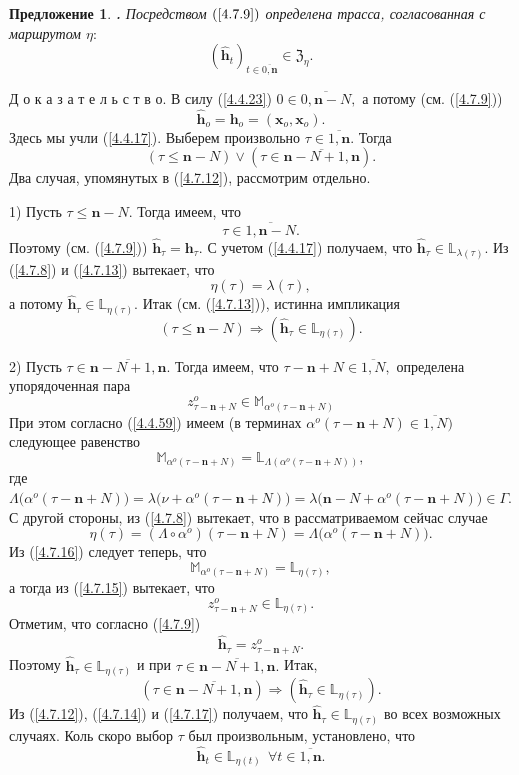 \documentclass[11pt,twoside,openany]{report}
\newcommand{\bfn}{\begin{equation}}
\newcommand{\efn}{\end{equation}}
\newcommand{\ov}{\overline}
\newcounter{theo}
\newcounter{pred}
\newtheorem{pred}{Предложение}[section]
\newcommand{\TL}{\mbox{\bf{$\!\!$.}}}
\newcommand{\La}{\Lambda}
\newcommand{\la}{\lambda}
\newcommand{\al}{\alpha}
\newcommand{\fa}{\forall}
\newcommand{\bbl}{{\mathbb L}}
\newcommand{\bbm}{{\mathbb M}}
\newcommand{\nn}{{\mathbf n}}
\begin{document}
{{\begin{pred}\label{p4.7.1}{\TL} Посредством $(\ref{4.7.9})$ определена трасса,
согласованная с маршрутом $\eta:$
\bfn\label{4.7.10}(\hat{\mathbf{h}}_t)_{t\in \ov{0,\mathbf{n}}}\in \mathfrak{Z}_\eta.
\efn
\end{pred}

Д о к а з а т е л ь с т в о. В силу (\ref{4.4.23}) $0\in\ov{0,\nn-N},$ а потому
(см. (\ref{4.7.9}))
\bfn\label{4.7.11}\hat{\mathbf{h}}_o = \mathbf{h}_o = (\mathbf{x}_o,\mathbf{x}_o).
\efn
Здесь мы учли (\ref{4.4.17}). Выберем произвольно $\tau\in\ov{1,\nn}.$ Тогда
\bfn\label{4.7.12}(\tau\leqslant \nn-N)\vee (\tau\in \ov{\nn-N+1,\nn}).
\efn
Два случая, упомянутых в (\ref{4.7.12}), рассмотрим отдельно.

1) Пусть $\tau\leqslant \nn-N.$ Тогда имеем, что
\bfn\label{4.7.13}\tau\in \ov{1,\nn-N}.
\efn
Поэтому (см. (\ref{4.7.9})) $\hat{\mathbf{h}}_\tau = \mathbf{h}_\tau.$ С учетом
(\ref{4.4.17}) получаем, что $\hat{\mathbf{h}}_\tau\in \bbl_{\la(\tau)}.$ Из
(\ref{4.7.8}) и (\ref{4.7.13}) вытекает, что
$$\eta(\tau) = \la(\tau),
$$
а потому $\hat{\mathbf{h}}_\tau\in\bbl_{\eta(\tau)}.$ Итак (см. (\ref{4.7.13})),
истинна импликация
\bfn\label{4.7.14}(\tau\leqslant \nn-N) \Longrightarrow (\hat{\mathbf{h}}_\tau\in \bbl_{\eta(\tau)}).
\efn

2) Пусть $\tau\in\ov{\nn-N+1,\nn}.$ Тогда имеем, что $\tau-\nn+N\in\ov{1,N},$ определена
упорядоченная пара
\bfn\label{4.7.15}z_{\tau-\nn+N}^o\in\bbm_{\al^o(\tau-\nn+N)}
\efn
При этом согласно (\ref{4.4.59}) имеем (в терминах $\al^o(\tau-\nn+N)\in\ov{1,N})$
следующее равенство
\bfn\label{4.7.16}\bbm_{\al^o(\tau-\nn+N)} = \bbl_{\La(\al^o(\tau-\nn+N))},
\efn
где $\La\bigl(\al^o(\tau-\nn+N)\bigl) = \la\bigl(\nu + \al^o(\tau-\nn+N)\bigl) =
\la\bigl(\nn-N +\al^o(\tau-\nn+N)\bigl) \in \Gamma.$  С другой стороны, из (\ref{4.7.8})
вытекает, что в рассматриваемом сейчас случае
$$\eta(\tau) = (\La\circ \al^o)(\tau-\nn+N) = \La\bigl(\al^o(\tau-\nn+N)\bigl).
$$
Из (\ref{4.7.16}) следует теперь, что
$$\bbm_{\al^o(\tau-\nn+N)} = \bbl_{\eta(\tau)},
$$
а тогда из (\ref{4.7.15}) вытекает, что
$$z^o_{\tau-\nn+N} \in \bbl_{\eta(\tau)}.
$$
Отметим, что согласно (\ref{4.7.9})
$$\hat{\mathbf{h}}_\tau = z^o_{\tau-\nn+N}.
$$
Поэтому $\hat{\mathbf{h}}_\tau \in\bbl_{\eta(\tau)}$ и при $\tau\in \ov{\nn-N+1,\nn}.$ Итак,
\bfn\label{4.7.17}(\tau\in\ov{\nn-N+1,\nn}) \Longrightarrow (\hat{\mathbf{h}}_\tau\in \bbl_{\eta(\tau)}).
\efn
Из (\ref{4.7.12}), (\ref{4.7.14}) и (\ref{4.7.17}) получаем, что
$\hat{\mathbf{h}}_\tau\in \bbl_{\eta(\tau)}$ во всех возможных случаях.
Коль скоро выбор $\tau$ был произвольным, установлено, что
\bfn\label{4.7.18}\hat{\mathbf{h}}_t\in \bbl_{\eta(t)} \ \ \fa t\in \ov{1,\nn}.
\efn

}}
\end{document}
